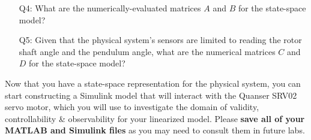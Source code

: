 \documentclass[12pt]{report}
\newcommand\drew[1]{\textcolor{red}{#1}}
\begin{document}
\begin{enumerate}[Question]
    \item[Q4:] What are the numerically-evaluated matrices $A$ and $B$ for the state-space model?\\
    \item[Q5:] Given that the physical system's sensors are limited to reading the rotor shaft angle and the pendulum angle, what are the numerical matrices $C$ and $D$ for the state-space model?\\
\end{enumerate}
Now that you have a state-space representation for the physical system, you can start constructing a Simulink model that will interact with the Quanser SRV02 servo motor, which you will use to investigate the domain of validity, controllability \& observability for your linearized model. Please \textbf{save all of your MATLAB and Simulink files} as you may need to consult them in future labs.
\end{document}
